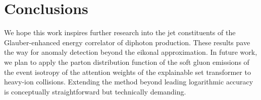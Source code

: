 \section{Conclusions}\label{sec:conclusions}

We hope this work inspires further research into the jet constituents of
the Glauber-enhanced energy correlator of diphoton production. These
results pave the way for anomaly detection beyond the eikonal
approximation. In future work, we plan to apply the parton distribution
function of the soft gluon emissions of the event isotropy of the
attention weights of the explainable set transformer to heavy-ion
collisions. Extending the method beyond leading logarithmic accuracy is
conceptually straightforward but technically demanding.

